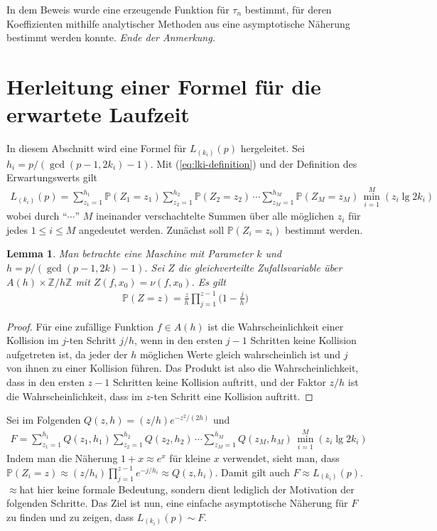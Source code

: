 \documentclass[a4paper, 11pt, ngerman]{article}
\newcommand{\Z}{\mathbb{Z}}
\renewcommand{\P}{\mathbb{P}}
\theoremstyle{definition}
\theoremstyle{plain}
\newtheorem{lemma}{Lemma}
\theoremstyle{remark}
\begin{document}
In dem Beweis wurde eine erzeugende Funktion für $\tau_n$ bestimmt, für deren Koeffizienten mithilfe analytischer Methoden aus \cite{fo90} eine asymptotische Näherung bestimmt werden konnte. \emph{Ende der Anmerkung.}

\section{Herleitung einer Formel für die erwartete Laufzeit}
\label{sec:formula-running-time}

In diesem Abschnitt wird eine Formel für $L_{(k_i)}(p)$ hergeleitet. Sei $h_i = p/(\gcd(p - 1, 2k_i) - 1)$. Mit (\ref{eq:lki-definition}) und der Definition des Erwartungswerts gilt
\begin{align}
    L_{(k_i)}(p) =
    \sum_{z_1 = 1}^{h_1} \P(Z_1 = z_1)
    \sum_{z_2 = 1}^{h_2} \P(Z_2 = z_2) \, \cdots
    \sum_{z_M = 1}^{h_M} \P(Z_M = z_M)
    \, \min_{i = 1}^M(z_i \lg 2k_i)
    \label{eq:lki-written-out}
\end{align}
wobei durch "`$\cdots$"' $M$ ineinander verschachtelte Summen über alle möglichen $z_i$ für jedes $1 \le i \le M$ angedeutet werden. Zunächst soll $\P(Z_i = z_i)$ bestimmt werden.

\begin{lemma}
    Man betrachte eine Maschine mit Parameter $k$ und $h = p/(\gcd(p - 1, 2k) - 1)$. Sei $Z$ die gleichverteilte Zufallsvariable über $A(h) \times \Z/h\Z$ mit $Z(f, x_0) = \nu(f, x_0)$. Es gilt
    \begin{align*}
        \P(Z = z) = \frac z h \prod_{j = 1}^{z - 1} \bigg (1 - \frac j h \bigg )
    \end{align*}

    \label{lemma:prob-s-z}
\end{lemma}

\begin{proof}
    Für eine zufällige Funktion $f \in A(h)$ ist die Wahrscheinlichkeit einer Kollision im $j$-ten Schritt $j/h$, wenn in den ersten $j - 1$ Schritten keine Kollision aufgetreten ist, da jeder der $h$ möglichen Werte gleich wahrscheinlich ist und $j$ von ihnen zu einer Kollision führen. Das Produkt ist also die Wahrscheinlichkeit, dass in den ersten $z - 1$ Schritten keine Kollision auftritt, und der Faktor $z/h$ ist die Wahrscheinlichkeit, dass im $z$-ten Schritt eine Kollision auftritt.
\end{proof}

Sei im Folgenden $Q(z, h) = (z/h) e^{-z^2/(2h)}$ und
\begin{align}
    F =
    \sum_{z_1 = 1}^{h_1} Q(z_1, h_1)
    \sum_{z_2 = 1}^{h_2} Q(z_2, h_2) \, \cdots
    \sum_{z_M = 1}^{h_M} Q(z_M, h_M)
    \, \min_{i = 1}^M(z_i \lg 2k_i)
    \label{eq:f-definition}
\end{align}
Indem man die Näherung $1 + x \approx e^x$ für kleine $x$ verwendet, sieht man, dass $\P(Z_i = z) \approx (z/h_i) \prod_{j = 1}^{z - 1} e^{-j/h_i} \approx Q(z, h_i)$. Damit gilt auch $F \approx L_{(k_i)}(p)$. \glqq $\approx$\grqq \space hat hier keine formale Bedeutung, sondern dient lediglich der Motivation der folgenden Schritte. Das Ziel ist nun, eine einfache asymptotische Näherung für $F$ zu finden und zu zeigen, dass $L_{(k_i)}(p) \sim F$.
\end{document}
